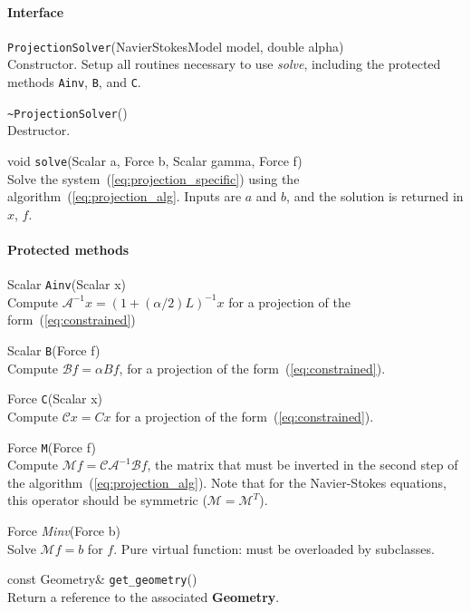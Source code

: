 \documentclass[11pt]{article}
\def\class#1{{\bf #1}} %
\def\fn#1{{\tt #1}} %
\def\virtualfn#1{{\it #1}} %
\begin{document}
\paragraph{Interface}
\begin{description}
	\item \fn{ProjectionSolver}(NavierStokesModel model, double alpha)\\
		Constructor.  Setup all routines necessary to use \virtualfn{solve}, including the protected methods \fn{Ainv}, \fn{B}, and \fn{C}.
	\item \fn{\~\null ProjectionSolver}()\\
		Destructor.
	\item void \fn{solve}(Scalar a, Force b, Scalar gamma, Force f)\\
	 	Solve the system~(\ref{eq:projection_specific}) using the algorithm~(\ref{eq:projection_alg}.  Inputs are $a$ and $b$, and the solution is returned in $x$, $f$.
\end{description}
\paragraph{Protected methods}
\begin{description}
	\item Scalar \fn{Ainv}(Scalar x)\\
		Compute $\mathcal{A}^{-1}x=(1+(\alpha/2)L)^{-1}x$ for a projection of the form~(\ref{eq:constrained})
	\item Scalar \fn{B}(Force f)\\
		Compute $\mathcal{B}f=\alpha Bf$, for a projection of the form~(\ref{eq:constrained}).
	\item Force \fn{C}(Scalar x)\\
		Compute $\mathcal{C}x=Cx$ for a projection of the form~(\ref{eq:constrained}).
	\item Force \fn{M}(Force f)\\
		Compute $\mathcal{M}f=\mathcal{C}\mathcal{A}^{-1}\mathcal{B}f$, the matrix that must be inverted in the second step of the algorithm~(\ref{eq:projection_alg}).  Note that for the Navier-Stokes equations, this operator should be symmetric ($\mathcal{M}=\mathcal{M}^T$).
	\item Force \virtualfn{Minv}(Force b)\\
		Solve $\mathcal{M}f=b$ for $f$.  Pure virtual function: must be overloaded by subclasses.
	\item const Geometry\& \fn{get\_geometry}()\\
		Return a reference to the associated \class{Geometry}.
\end{description}
\end{document}
